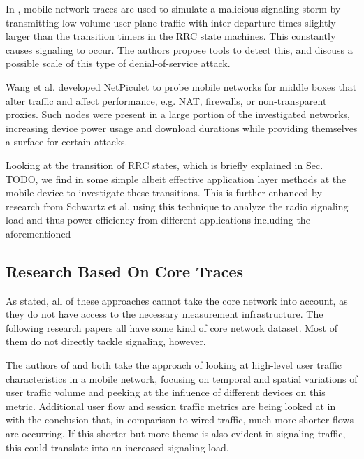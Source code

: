 In \cite{lee2007detection}, mobile network traces are used to simulate a malicious signaling storm by transmitting low-volume user plane traffic with inter-departure times slightly larger than the transition timers in the \gls{RRC} state machines. This constantly causes signaling to occur. The authors propose tools to detect this, and discuss a possible scale of this type of denial-of-service attack.

 
Wang et al.\cite{sigcomm11middleboxes} developed NetPiculet to probe mobile networks for middle boxes that alter traffic and affect performance, e.g. NAT, firewalls, or non-transparent proxies. Such nodes were present in a large portion of the investigated networks, increasing device power usage and download durations while providing themselves a surface for certain attacks.

Looking at the transition of \gls{RRC} states, which is briefly explained in Sec. TODO, we find in \cite{5360763} some simple albeit effective application layer methods at the mobile device to investigate these transitions. This is further enhanced by research from Schwartz et al.\cite{schwartz2013angrybirds} using this technique to analyze the radio signaling load and thus power efficiency from different applications including the aforementioned


\subsection{Research Based On Core Traces}

As stated, all of these approaches cannot take the core network into account, as they do not have access to the necessary measurement infrastructure. The following research papers all have some kind of core network dataset. Most of them do not directly tackle signaling, however.

The authors of \cite{shafiq2011characterizing} and \cite{paul2011understanding} both take the approach of looking at high-level user traffic characteristics in a mobile network, focusing on temporal and spatial variations of user traffic volume and peeking at the influence of different devices on this metric. Additional user flow and session traffic metrics are being looked at in \cite{Zhang:2012:UCC:2377677.2377764} with the conclusion that, in comparison to wired traffic, much more shorter flows are occurring. If this shorter-but-more theme is also evident in signaling traffic, this could translate into an increased signaling load.

